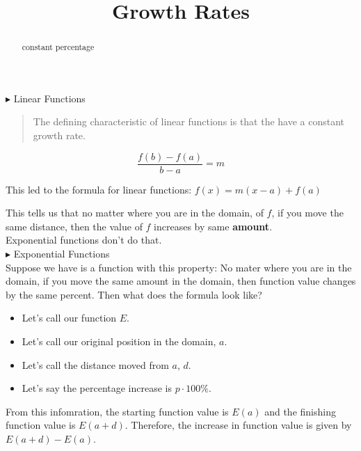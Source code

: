 \documentclass{ximera}
\title{Growth Rates}
\begin{document}
\begin{abstract}
constant percentage
\end{abstract}
\maketitle










$\blacktriangleright$ Linear Functions \\


\begin{quote}
The defining characteristic of linear functions is that the have a constant growth rate.
\end{quote}





\[   \frac{f(b)-f(a)}{b-a} = m       \]

This led to the formula for linear functions:  $f(x) = m(x-a) + f(a)$


This tells us that no matter where you are in the domain, of $f$, if you move the same distance, then the value of $f$ increases by same \textbf{amount}. \\


Exponential functions don't do that. \\



$\blacktriangleright$ Exponential Functions \\



Suppose we have is a function with this property:  No mater where you are in the domain, if you move the same amount in the domain, then function value changes by the same percent.  Then what does the formula look like?



\begin{itemize}
\item Let's call our function $E$.
\item Let's call our original position in the domain, $a$.
\item Let's call the distance moved from $a$, $d$.
\item Let's say the percentage increase is $p \cdot 100\%$. 
\end{itemize}



From this infomration, the starting function value is $E(a)$ and the finishing function value is $E(a+d)$.  Therefore, the increase in function value is given by $E(a+d) - E(a)$.
\end{document}

